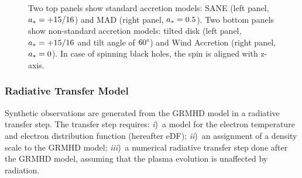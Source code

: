 \begin{figure}
{    Two top panels show standard accretion models: SANE (left panel, $a_*=+15/16$) and MAD (right panel, $a_*=0.5$).
    Two bottom panels show non-standard accretion models: tilted disk (left panel, $a_*=+15/16$ and tilt angle of $60\degree$) and Wind Accretion (right panel, $a_*=0$).
    In case of spinning black holes, the spin is aligned with z-axis.
  }
  \label{fig:GRMHD}
\end{figure}

\subsubsection{Radiative Transfer Model}

Synthetic observations are generated from the GRMHD model in a radiative transfer step.
The transfer step requires: %
\emph{i})~a model for the electron temperature and electron distribution function (hereafter eDF);
\emph{ii})~an assignment of a density scale to the GRMHD model;
\emph{iii})~a numerical radiative transfer step done after the GRMHD model, assuming that the plasma evolution is unaffected by radiation.

